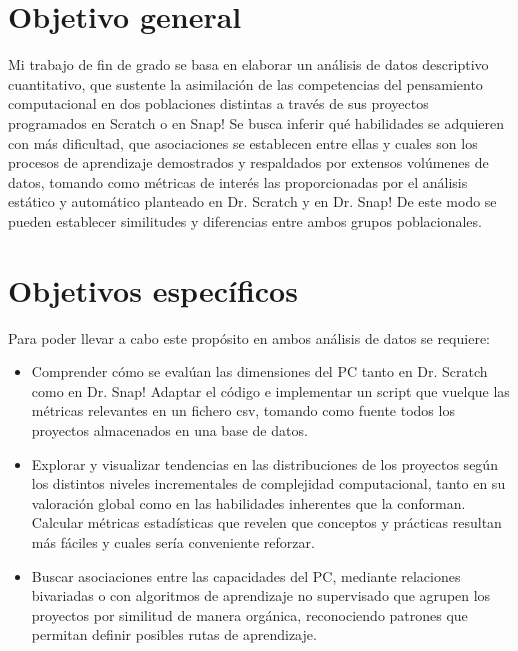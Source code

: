 \documentclass[a4paper, 12pt]{book}
\begin{document}
\section{Objetivo general} 
\label{sec:objetivo-general} 

Mi trabajo de fin de grado se basa en elaborar un análisis de datos descriptivo cuantitativo, que sustente la asimilación de las competencias del pensamiento computacional en dos poblaciones distintas a través de sus proyectos programados en Scratch o en Snap! Se busca inferir qué habilidades se adquieren con más dificultad, que asociaciones se establecen entre ellas y cuales son los procesos de aprendizaje demostrados y respaldados por extensos volúmenes de datos, tomando como métricas de interés las proporcionadas por el análisis estático y automático planteado en Dr. Scratch y en Dr. Snap! De este modo se pueden establecer similitudes y diferencias entre ambos grupos poblacionales.

\section{Objetivos específicos}
\label{sec:objetivos-especificos}

Para poder llevar a cabo este propósito en ambos análisis de datos se requiere:

\begin{itemize}
    \item Comprender cómo se evalúan las dimensiones del PC tanto en Dr. Scratch como en Dr. Snap! Adaptar el código e implementar un script que vuelque las métricas relevantes en un fichero csv, tomando como fuente todos los proyectos almacenados en una base de datos.
    \item Explorar y visualizar tendencias en las distribuciones de los proyectos según los distintos niveles incrementales de complejidad computacional, tanto en su valoración global como en las habilidades inherentes que la conforman. Calcular métricas estadísticas que revelen que conceptos y prácticas resultan más fáciles y cuales sería conveniente reforzar. 
    \item Buscar asociaciones entre las capacidades del PC, mediante relaciones bivariadas o con algoritmos de aprendizaje no supervisado que agrupen los proyectos por similitud de manera orgánica, reconociendo patrones que permitan definir posibles rutas de aprendizaje.
   
\end{itemize}
\end{document}
